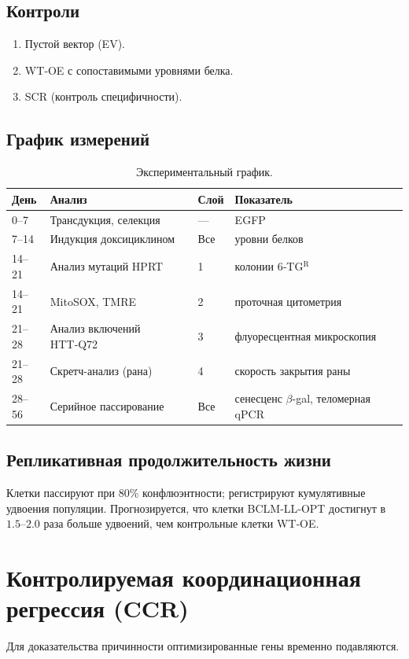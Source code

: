 \documentclass[12pt,a4paper]{article}
\begin{document}
	\subsection{Контроли}
	\begin{enumerate}
		\item Пустой вектор (EV).
		\item WT‑OE с сопоставимыми уровнями белка.
		\item SCR (контроль специфичности).
	\end{enumerate}
	
	\subsection{График измерений}
	\begin{table}[H]
		\centering
		\caption{Экспериментальный график.}
		\label{tab:schedule}
		\begin{tabular}{@{}llll@{}}
			\toprule
			\textbf{День} & \textbf{Анализ} & \textbf{Слой} & \textbf{Показатель} \\
			\midrule
			0–7   & Трансдукция, селекция & --- & EGFP \\
			7–14  & Индукция доксициклином & Все & уровни белков \\
			14–21 & Анализ мутаций HPRT & 1 & колонии 6‑TG\(^{\mathrm{R}}\) \\
			14–21 & MitoSOX, TMRE & 2 & проточная цитометрия \\
			21–28 & Анализ включений HTT‑Q72 & 3 & флуоресцентная микроскопия \\
			21–28 & Скретч-анализ (рана) & 4 & скорость закрытия раны \\
			28–56 & Серийное пассирование & Все & сенесценс \(\beta\)-gal, теломерная qPCR \\
			\bottomrule
		\end{tabular}
	\end{table}
	
	\subsection{Репликативная продолжительность жизни}
	Клетки пассируют при 80\% конфлюэнтности; регистрируют кумулятивные удвоения популяции. Прогнозируется, что клетки BCLM‑LL‑OPT достигнут в \(1.5\)–\(2.0\) раза больше удвоений, чем контрольные клетки WT‑OE.
	
	\section{Контролируемая координационная регрессия (CCR)}
	\label{sec:CCR}
	Для доказательства причинности оптимизированные гены временно подавляются.
	
\end{document}
